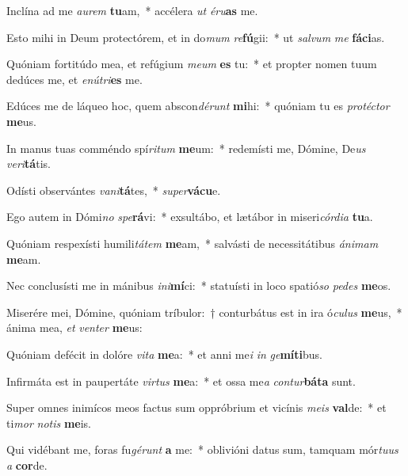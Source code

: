 \item Inclína ad me \textit{au}\textit{rem} \textbf{tu}am,~* accélera \textit{ut} \textit{é}\textit{ru}\textbf{as} me.
\item Esto mihi in Deum protectórem, et in do\textit{mum} \textit{re}\textbf{fú}gii:~* ut \textit{sal}\textit{vum} \textit{me} \textbf{fá}\textbf{ci}as.
\item Quóniam fortitúdo mea, et refúgium \textit{me}\textit{um} \textbf{es} tu:~* et propter nomen tuum dedúces me, et \textit{e}\textit{nú}\textit{tri}\textbf{es} me.
\item Edúces me de láqueo hoc, quem abscon\textit{dé}\textit{runt} \textbf{mi}hi:~* quóniam tu es \textit{pro}\textit{téc}\textit{tor} \textbf{me}us.
\item In manus tuas comméndo spí\textit{ri}\textit{tum} \textbf{me}um:~* redemísti me, Dómine, De\textit{us} \textit{ve}\textit{ri}\textbf{tá}tis.
\item Odísti observántes \textit{va}\textit{ni}\textbf{tá}tes,~* \textit{su}\textit{per}\textbf{vá}\textbf{cu}e.
\item Ego autem in Dómi\textit{no} \textit{spe}\textbf{rá}vi:~* exsultábo, et lætábor in miseri\textit{cór}\textit{di}\textit{a} \textbf{tu}a.
\item Quóniam respexísti humili\textit{tá}\textit{tem} \textbf{me}am,~* salvásti de necessitátibus \textit{á}\textit{ni}\textit{mam} \textbf{me}am.
\item Nec conclusísti me in mánibus \textit{in}\textit{i}\textbf{mí}ci:~* statuísti in loco spatió\textit{so} \textit{pe}\textit{des} \textbf{me}os.
\item Miserére mei, Dómine, quóniam tríbulor:~† conturbátus est in ira ó\textit{cu}\textit{lus} \textbf{me}us,~* ánima mea, \textit{et} \textit{ven}\textit{ter} \textbf{me}us:
\item Quóniam defécit in dolóre \textit{vi}\textit{ta} \textbf{me}a:~* et anni me\textit{i} \textit{in} \textit{ge}\textbf{mí}\textbf{ti}bus.
\item Infirmáta est in paupertáte \textit{vir}\textit{tus} \textbf{me}a:~* et ossa me\textit{a} \textit{con}\textit{tur}\textbf{bá}\textbf{ta} sunt.
\item Super omnes inimícos meos factus sum oppróbrium et vicínis \textit{me}\textit{is} \textbf{val}de:~* et ti\textit{mor} \textit{no}\textit{tis} \textbf{me}is.
\item Qui vidébant me, foras fu\textit{gé}\textit{runt} \textbf{a} me:~* oblivióni datus sum, tamquam mór\textit{tu}\textit{us} \textit{a} \textbf{cor}de.
